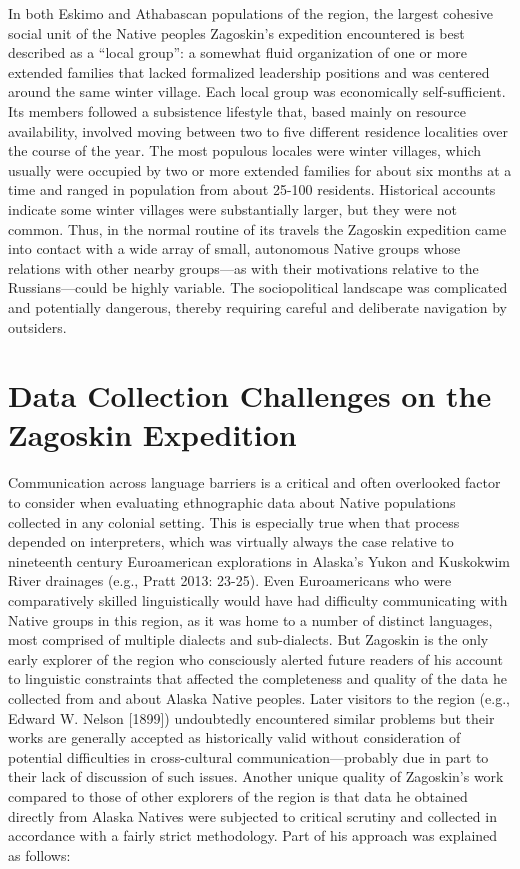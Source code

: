 In both Eskimo and Athabascan populations of the region, the largest cohesive social unit of the Native peoples Zagoskin’s expedition encountered is best described as a “local group”: a somewhat fluid organization of one or more extended families that lacked formalized leadership positions and was centered around the same winter village. Each local group was economically self-sufficient. Its members followed a subsistence lifestyle that, based mainly on resource availability, involved moving between two to five different residence localities over the course of the year. The most populous locales were winter villages, which usually were occupied by two or more extended families for about six months at a time and ranged in population from about 25-100 residents. Historical accounts indicate some winter villages were substantially larger, but they were not common. Thus, in the normal routine of its travels the Zagoskin expedition came into contact with a wide array of small, autonomous Native groups whose relations with other nearby groups—as with their motivations relative to the Russians—could be highly variable. The sociopolitical landscape was complicated and potentially dangerous, thereby requiring careful and deliberate navigation by outsiders.

\section{Data Collection Challenges on the Zagoskin Expedition}
Communication across language barriers is a critical and often overlooked factor to consider when evaluating ethnographic data about Native populations collected in any colonial setting. This is especially true when that process depended on interpreters, which was virtually always the case relative to nineteenth century Euroamerican explorations in Alaska’s Yukon and Kuskokwim River drainages (e.g., Pratt 2013: 23-25). Even Euroamericans who were comparatively skilled linguistically would have had difficulty communicating with Native groups in this region, as it was home to a number of distinct languages, most comprised of multiple dialects and sub-dialects. But Zagoskin is the only early explorer of the region who consciously alerted future readers of his account to linguistic constraints that affected the completeness and quality of the data he collected from and about Alaska Native peoples. Later visitors to the region (e.g., Edward W. Nelson [1899]) undoubtedly encountered similar problems but their works are generally accepted as historically valid without consideration of potential difficulties in cross-cultural communication—probably due in part to their lack of discussion of such issues. Another unique quality of Zagoskin’s work compared to those of other explorers of the region is that data he obtained directly from Alaska Natives were subjected to critical scrutiny and collected in accordance with a fairly strict methodology. Part of his approach was explained as follows:

